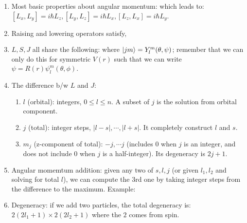 \documentclass{school-22.101-notes}
\date{December 15, 2011}
\begin{document}
\maketitle



\clearpage
{} 
  \begin{enumerate}
  \item Most basic properties about angular momentum:
    which leads to: $[L_x, L_y] = i \hbar L_z, [L_y, L_z] = i \hbar L_x, [L_z, L_x] = i \hbar L_y$. 

  \item Raising and lowering operators satisfy,

  \item $L, S, J$ all share the following: where $\left| jm \right> = Y_l^m (\theta, \psi)$; remember that we can only do this for symmetric $V(r)$ such that we can write $\psi = R(r) \psi_l^m (\theta, \phi)$. 

\item The difference b/w $L$ and $J$:  
  \begin{enumerate}
  \item $l$ (orbital): integers, $0 \le l \le n$. A subset of $j$ is the solution from orbital component. 
  \item $j$ (total): integer steps, $|l-s|, \cdots, |l+s|$. It completely construct $l$ and $s$. 
  \item $m_j$ (z-component of total): $-j, \cdots j$ (includes 0 when $j$ is an integer, and does not include 0 when $j$ is a half-integer). Its degeneracy is $2j+1$. 
  \end{enumerate}



\item Angular momemtum addition: given any two of $s, l, j$ (or given $l_1, l_2$ and solving for total $l$), we can compute the 3rd one by taking integer steps from the difference to the maximum. Example: 


\item Degeneracy: if we add two particles, the total degeneracy is: $2(2l_1+1) \times 2(2l_2 +1)$ where the $2$ comes from spin. 
  \end{enumerate}
\end{document}

